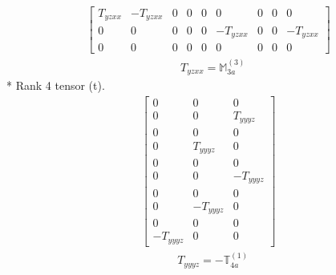 \documentclass[fleqn,8pt,landscape]{jsarticle}
\begin{document}
\begin{align*}
\begin{bmatrix} T_{yzxx} & - T_{yzxx} & 0 & 0 & 0 & 0 & 0 & 0 & 0 \\ 0 & 0 & 0 & 0 & 0 & - T_{yzxx} & 0 & 0 & - T_{yzxx} \\ 0 & 0 & 0 & 0 & 0 & 0 & 0 & 0 & 0 \end{bmatrix}
\end{align*}
\begin{align*}
& T_{yzxx} = \mathbb{M}_{3a}^{(3)}
\end{align*}
* Rank 4 tensor (t).
\begin{align*}
\begin{bmatrix} 0 & 0 & 0 \\ 0 & 0 & T_{yyyz} \\ 0 & 0 & 0 \\ 0 & T_{yyyz} & 0 \\ 0 & 0 & 0 \\ 0 & 0 & - T_{yyyz} \\ 0 & 0 & 0 \\ 0 & - T_{yyyz} & 0 \\ 0 & 0 & 0 \\ - T_{yyyz} & 0 & 0 \end{bmatrix}
\end{align*}
\begin{align*}
& T_{yyyz} = - \mathbb{T}_{4a}^{(1)}
\end{align*}
\end{document}
